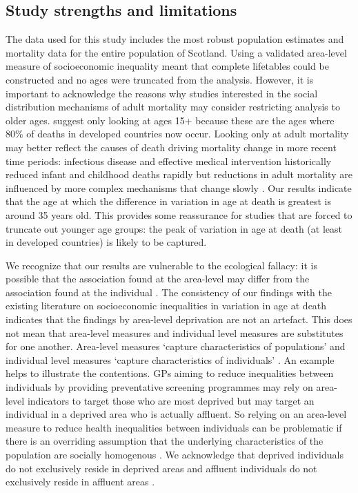 \documentclass[12pt,oneside,a4paper]{article} %
\theoremstyle{definition}
\begin{document}
\subsection{Study strengths and limitations}
The data used for this study includes the most robust population estimates and mortality data for the entire population of Scotland. Using a validated area-level measure of socioeconomic inequality meant that complete lifetables could be constructed and no ages were truncated from the analysis. However, it is important to acknowledge the reasons why studies interested in the social distribution mechanisms of adult mortality may consider restricting analysis to older ages. \citet{Smits2009} suggest only looking at ages 15+ because these are the ages where 80\% of deaths in developed countries now occur. Looking only at adult mortality may better reflect the causes of death driving mortality change in more recent time periods: infectious disease and effective medical intervention historically reduced infant and childhood deaths rapidly but reductions in adult mortality are influenced by more complex mechanisms that change slowly \citep{Smits2009,Vallin2004}. Our results indicate that the age at which the difference in variation in age at death is greatest is around 35 years old. This provides some reassurance for studies that are forced to truncate out younger age groups: the peak of variation in age at death (at least in developed countries) is likely to be captured. 

We recognize that our results are vulnerable to the ecological fallacy: it is possible that the association found at the area-level may differ from the association found at the individual \citep{Diez2002}. The consistency of our findings with the existing literature on socioeconomic inequalities in variation in age at death \citep{Broennum-Hansen2017,Raalte2014} indicates that the findings by area-level deprivation are not an artefact. This does not mean that area-level measures and individual level measures are substitutes for one another. Area-level measures ‘capture characteristics of populations’ and individual level measures ‘capture characteristics of individuals’ \citep{Leyland2007}. An example helps to illustrate the contentions. GPs aiming to reduce inequalities between individuals by providing preventative screening programmes may rely on area-level indicators to target those who are most deprived but may target an individual in a deprived area who is actually affluent. So relying on an area-level measure to reduce health inequalities between individuals can be problematic if there is an overriding assumption that the underlying characteristics of the population are socially homogenous \citep{Fischbacher2014}. We acknowledge that deprived individuals do not exclusively reside in deprived areas and affluent individuals do not exclusively reside in affluent areas \citep{Leyland2007}.
\end{document}
